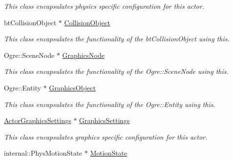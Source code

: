 \begin{DoxyCompactItemize}
\begin{DoxyCompactList}\small\item\em This class encapsulates physics specific configuration for this actor. \item\end{DoxyCompactList}\item 
\hypertarget{classphys_1_1ActorBase_a70676c52ffee64705a7b463d29b60429}{
btCollisionObject $\ast$ \hyperlink{classphys_1_1ActorBase_a70676c52ffee64705a7b463d29b60429}{CollisionObject}}
\label{classphys_1_1ActorBase_a70676c52ffee64705a7b463d29b60429}

\begin{DoxyCompactList}\small\item\em This class encapsulates the functionality of the btCollisionObject using this. \item\end{DoxyCompactList}\item 
\hypertarget{classphys_1_1ActorBase_a7262c31023ff41a027206e47befc7417}{
Ogre::SceneNode $\ast$ \hyperlink{classphys_1_1ActorBase_a7262c31023ff41a027206e47befc7417}{GraphicsNode}}
\label{classphys_1_1ActorBase_a7262c31023ff41a027206e47befc7417}

\begin{DoxyCompactList}\small\item\em This class encapsulates the functionality of the Ogre::SceneNode using this. \item\end{DoxyCompactList}\item 
\hypertarget{classphys_1_1ActorBase_a25f3811fa1b2206dbabfaa2d6eb97784}{
Ogre::Entity $\ast$ \hyperlink{classphys_1_1ActorBase_a25f3811fa1b2206dbabfaa2d6eb97784}{GraphicsObject}}
\label{classphys_1_1ActorBase_a25f3811fa1b2206dbabfaa2d6eb97784}

\begin{DoxyCompactList}\small\item\em This class encapsulates the functionality of the Ogre::Entity using this. \item\end{DoxyCompactList}\item 
\hypertarget{classphys_1_1ActorBase_acc34ec92179b9ebe392bb0ae98ce5d3a}{
\hyperlink{classphys_1_1ActorGraphicsSettings}{ActorGraphicsSettings} $\ast$ \hyperlink{classphys_1_1ActorBase_acc34ec92179b9ebe392bb0ae98ce5d3a}{GraphicsSettings}}
\label{classphys_1_1ActorBase_acc34ec92179b9ebe392bb0ae98ce5d3a}

\begin{DoxyCompactList}\small\item\em This class encapsulates graphics specific configuration for this actor. \item\end{DoxyCompactList}\item 
\hypertarget{classphys_1_1ActorBase_ab776527aa927b8787313c50530cc24ba}{
internal::PhysMotionState $\ast$ \hyperlink{classphys_1_1ActorBase_ab776527aa927b8787313c50530cc24ba}{MotionState}}
\label{classphys_1_1ActorBase_ab776527aa927b8787313c50530cc24ba}


\end{DoxyCompactItemize}
